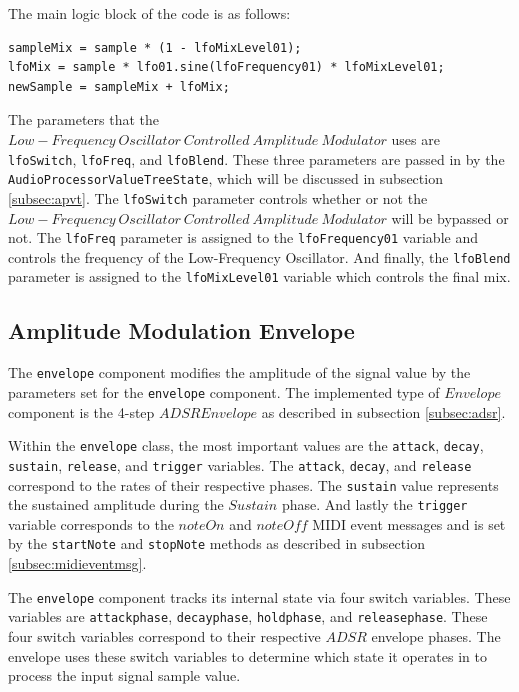 \documentclass[a4paper,12pt]{report}
\begin{document}
The main logic block of the code is as follows:
\begin{lstlisting}[caption={LFO Mix},label={code:addsample},captionpos=b]
sampleMix = sample * (1 - lfoMixLevel01);
lfoMix = sample * lfo01.sine(lfoFrequency01) * lfoMixLevel01;
newSample = sampleMix + lfoMix;
\end{lstlisting}

The parameters that the $Low-Frequency\ Oscillator\ Controlled\ Amplitude\ Modulator$ uses are \texttt{lfoSwitch}, \texttt{lfoFreq}, and \texttt{lfoBlend}. These three parameters are passed in by the \texttt{AudioProcessorValueTreeState}, which will be discussed in subsection \ref{subsec:apvt}. The \texttt{lfoSwitch} parameter controls whether or not the $Low-Frequency\ Oscillator\ Controlled\ Amplitude\ Modulator$ will be bypassed or not. The \texttt{lfoFreq} parameter is assigned to the \texttt{lfoFrequency01} variable and controls the frequency of the Low-Frequency Oscillator. And finally, the \texttt{lfoBlend} parameter is assigned to the \texttt{lfoMixLevel01} variable which controls the final mix.

\subsection{Amplitude Modulation Envelope}
\label{subsec:amenv}
The \texttt{envelope} component modifies the amplitude of the signal value by the parameters set for the \texttt{envelope} component. The implemented type of $Envelope$ component is the 4-step $ADSR Envelope$ as described in subsection \ref{subsec:adsr}. 

Within the \texttt{envelope} class, the most important values are the \texttt{attack}, \texttt{decay}, \texttt{sustain}, \texttt{release}, and \texttt{trigger} variables. The \texttt{attack}, \texttt{decay}, and \texttt{release} correspond to the rates of their respective phases. The \texttt{sustain} value represents the sustained amplitude during the $Sustain$ phase. And lastly the \texttt{trigger} variable corresponds to the $noteOn$ and $noteOff$ MIDI event messages and is set by the \texttt{startNote} and \texttt{stopNote} methods as described in subsection \ref{subsec:midieventmsg}.

The \texttt{envelope} component tracks its internal state via four switch variables. These variables are \texttt{attackphase}, \texttt{decayphase}, \texttt{holdphase}, and \texttt{releasephase}. These four switch variables correspond to their respective $ADSR$ envelope phases. The envelope uses these switch variables to determine which state it operates in to process the input signal sample value. 
\end{document}
